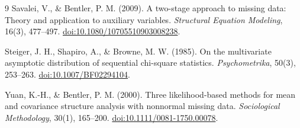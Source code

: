 \documentclass[11pt]{article}
\theoremstyle{plain}
\theoremstyle{remark}
\begin{document}
\begin{thebibliography}{9}
Savalei, V., \& Bentler, P. M. (2009).
A two-stage approach to missing data: Theory and application to auxiliary
variables.
\emph{Structural Equation Modeling}, 16(3), 477--497.
\href{https://doi.org/10.1080/10705510903008238}{doi:10.1080/10705510903008238}.

Steiger, J. H., Shapiro, A., \& Browne, M. W. (1985).
On the multivariate asymptotic distribution of sequential chi-square statistics.
\emph{Psychometrika}, 50(3), 253--263.
\href{https://doi.org/10.1007/BF02294104}{doi:10.1007/BF02294104}.

Yuan, K.-H., \& Bentler, P. M. (2000).
Three likelihood-based methods for mean and covariance structure analysis with
nonnormal missing data.
\emph{Sociological Methodology}, 30(1), 165--200.
\href{https://doi.org/10.1111/0081-1750.00078}{doi:10.1111/0081-1750.00078}.

\end{thebibliography}
\end{document}

